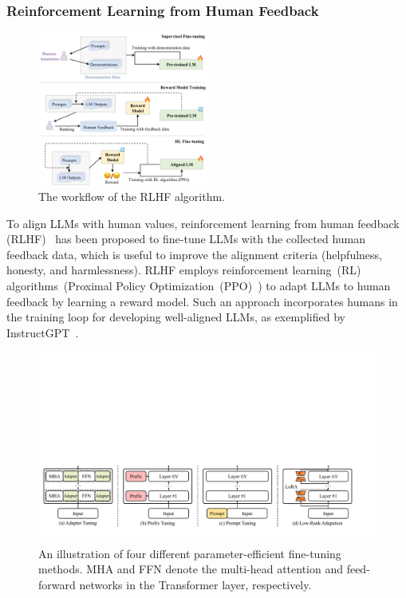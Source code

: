 \subsubsection{Reinforcement Learning from Human Feedback}\label{sub:RLHF}

\begin{figure}
    \centering
    \includegraphics[width=0.5\textwidth]{images/RLHF.pdf}
    \caption{The workflow of the RLHF algorithm.}
    \label{fig:RLHF}
\end{figure}

To align LLMs with human values, reinforcement learning from human feedback (RLHF)~\cite{Christiano-NeurIPS-2017-Deep,Ziegler-arxiv-2019-Fine-Tuning} has been proposed to fine-tune LLMs with the collected human feedback data, which is useful to improve the alignment criteria (\eg helpfulness, honesty, and harmlessness).
RLHF employs reinforcement learning~(RL) algorithms~(\eg Proximal Policy Optimization~(PPO)~\cite{schulman-arxiv-2017-proximal}) to  adapt LLMs to human feedback by learning a reward model. Such an approach incorporates humans in the training loop for developing well-aligned LLMs, as exemplified by InstructGPT~\cite{Ouyang-arxiv-2022-Training}. 

\begin{figure}[!t]
    \centering
    \includegraphics[width=1\textwidth]{images/Efficient-Tuning.pdf}
    \caption{An illustration of four different parameter-efficient fine-tuning methods. MHA and FFN denote the multi-head attention and feed-forward networks in the Transformer layer, respectively.}
    \label{fig:efficient-tuning}
\end{figure}

